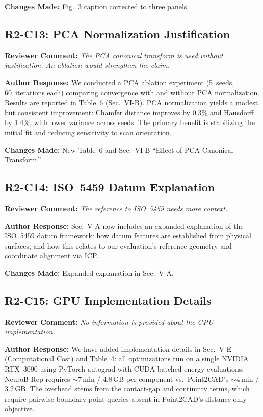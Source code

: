 \documentclass[11pt]{article}
\newcommand{\RC}[1]{\noindent\textcolor{revcolor}{\textbf{Reviewer Comment:} \emph{#1}}\par\medskip}
\newcommand{\AR}[1]{\noindent\textcolor{respcolor}{\textbf{Author Response:} #1}\par\medskip}
\newcommand{\CH}[1]{\noindent\textbf{Changes Made:} #1\par\bigskip}
\begin{document}
\CH{Fig.~3 caption corrected to three panels.}

\subsection*{R2-C13: PCA Normalization Justification}

\RC{The PCA canonical transform is used without justification.
An ablation would strengthen the claim.}

\AR{We conducted a PCA ablation experiment (5~seeds, 60~iterations
each) comparing convergence with and without PCA normalization.
Results are reported in Table~6 (Sec.~VI-B). PCA normalization
yields a modest but consistent improvement: Chamfer distance
improves by 0.3\% and Hausdorff by 1.4\%, with lower variance
across seeds. The primary benefit is stabilizing the initial
fit and reducing sensitivity to scan orientation.}

\CH{New Table~6 and Sec.~VI-B ``Effect of PCA Canonical Transform.''}

\subsection*{R2-C14: ISO~5459 Datum Explanation}

\RC{The reference to ISO~5459 needs more context.}

\AR{Sec.~V-A now includes an expanded explanation of the
ISO~5459 datum framework: how datum features are established
from physical surfaces, and how this relates to our
evaluation's reference geometry and coordinate alignment via ICP.}

\CH{Expanded explanation in Sec.~V-A.}

\subsection*{R2-C15: GPU Implementation Details}

\RC{No information is provided about the GPU implementation.}

\AR{We have added implementation details in Sec.~V-E
(Computational Cost) and Table~4: all optimizations run on a
single NVIDIA RTX~3090 using PyTorch autograd with CUDA-batched
energy evaluations. NeuroB-Rep requires ${\sim}7$\,min / 4.8\,GB
per component vs.\ Point2CAD's ${\sim}4$\,min / 3.2\,GB.
The overhead stems from the contact-gap and continuity terms,
which require pairwise boundary-point queries absent in
Point2CAD's distance-only objective.}
\end{document}
